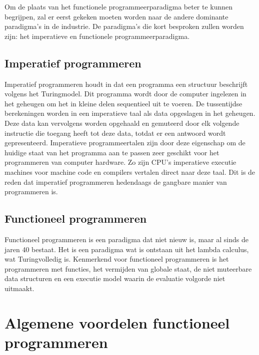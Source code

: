 \documentclass[twoside,twocolumn]{article}
\begin{document}
Om de plaats van het functionele programmeerparadigma beter te kunnen
begrijpen, zal er eerst gekeken moeten worden naar de andere dominante
paradigma's in de industrie. De paradigma's die kort besproken zullen worden
zijn: het imperatieve en functionele programmeerparadigma.


\subsection{Imperatief programmeren}
Imperatief programmeren houdt in dat een programma een structuur beschrijft
volgens het Turingmodel. Dit programma wordt door de computer ingelezen in het
geheugen om het in kleine delen sequentieel uit te voeren. De tussentijdse
berekeningen worden in een imperatieve taal als data opgeslagen in het
geheugen. Deze data kan vervolgens worden opgehaald en gemuteerd door elk
volgende instructie die toegang heeft tot deze data, totdat er een antwoord
wordt gepresenteerd. Imperatieve programmeertalen zijn door deze eigenschap om
de huidige staat van het programma aan te passen zeer geschikt voor het
programmeren van computer hardware. Zo zijn CPU's imperatieve executie machines
voor machine code en compilers vertalen direct naar deze taal. Dit is de reden
dat imperatief programmeren hedendaags de gangbare manier van programmeren is.

\subsection{Functioneel programmeren }
Functioneel programmeren is een paradigma dat niet nieuw is, maar al sinds de
jaren 40 bestaat. Het is een paradigma wat is ontstaan uit het
lambda calculus, wat Turingvolledig is. Kenmerkend voor functioneel
programmeren is het programmeren met functies, het vermijden van globale staat,
de niet muteerbare data structuren en een executie model waarin de evaluatie
volgorde niet uitmaakt.


\section{Algemene voordelen functioneel programmeren}
\end{document}
